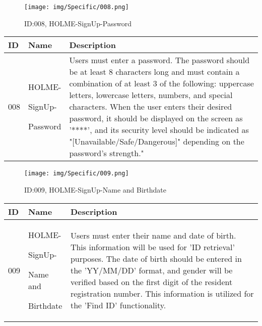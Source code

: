 \documentclass[conference]{IEEEtran}
\begin{document}
\begin{enumerate}
\begin{figure}[h]
\centering
\texttt{[image: img/Specific/008.png]}
\caption{ID:008, HOLME-SignUp-Password}
\end{figure}
\begin{table}[h]
\def\arraystretch{1.2} \small
    \begin{tabular}{|p{1cm}|p{1.8cm}|p{5.0cm}|}
        \hline
        ID & Name & Description\\ \hline
         008 \par  & HOLME-\par SignUp- \par Password &Users must enter a password. The password should be at least 8 characters long and must contain a combination of at least 3 of the following: uppercase letters, lowercase letters, numbers, and special characters. When the user enters their desired password, it should be displayed on the screen as '****', and its security level should be indicated as "[Unavailable/Safe/Dangerous]" depending on the password's strength."\\ \hline
	\end{tabular}
\end{table}

\begin{figure}[h]
\centering
\texttt{[image: img/Specific/009.png]}
\caption{ID:009, HOLME-SignUp-Name and Birthdate}
\end{figure}
\begin{table}[h]
\def\arraystretch{1.2} \small
    \begin{tabular}{|p{1cm}|p{1.8cm}|p{5.0cm}|}
        \hline
        ID & Name & Description\\ \hline
         009 \par  & HOLME-\par SignUp-\par Name and \par Birthdate &Users must enter their name and date of birth. This information will be used for 'ID retrieval' purposes. The date of birth should be entered in the 'YY/MM/DD' format, and gender will be verified based on the first digit of the resident registration number.
This information is utilized for the 'Find ID' functionality.\\ \hline
	\end{tabular}
\end{table}


\end{enumerate}
\end{document}
